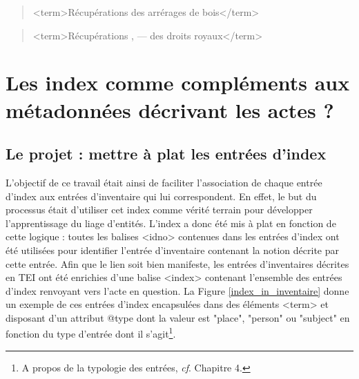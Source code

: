 \documentclass[a4paper,12pt,twoside]{book}
\begin{document}
	\begin{quotation}
		<term>Récupérations des arrérages de bois</term>
	\end{quotation}

	\begin{quotation}
		<term>Récupérations , — des droits royaux</term>
	\end{quotation}

	\section{Les index comme compléments aux métadonnées décrivant les actes ?}

	\subsection{Le projet : mettre à plat les entrées d’index}
	
	L'objectif de ce travail était ainsi de faciliter l'association de chaque entrée d'index aux entrées d'inventaire qui lui correspondent. En effet, le but du processus était d'utiliser cet index comme vérité terrain pour développer l'apprentissage du liage d'entités. L'index a donc été mis à plat en fonction de cette logique : toutes les balises <idno> contenues dans les entrées d'index ont été utilisées pour identifier l'entrée d'inventaire contenant la notion décrite par cette entrée. Afin que le lien soit bien manifeste, les entrées d'inventaires décrites en TEI ont été enrichies d'une balise <index> contenant l'ensemble des entrées d'index renvoyant vers l'acte en question. La Figure \ref{index_in_inventaire} donne un exemple de ces entrées d'index encapsulées dans des éléments <term> et disposant d'un attribut @type dont la valeur est "place", "person" ou "subject" en fonction du type d'entrée dont il s'agit\footnote{A propos de la typologie des entrées, \textit{cf}. Chapitre 4.}.
	
\end{document}
